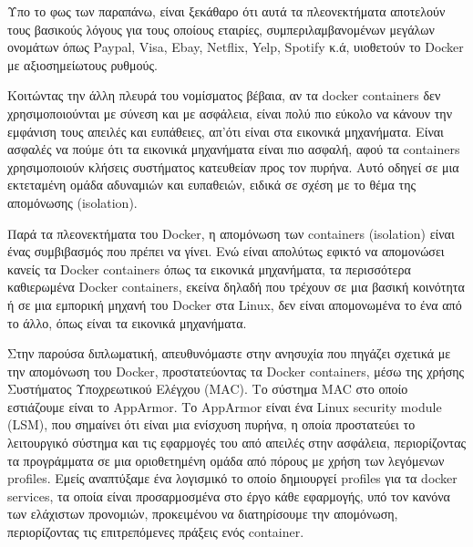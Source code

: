 Υπο το φως των παραπάνω, είναι ξεκάθαρο ότι αυτά τα πλεονεκτήματα αποτελούν τους βασικούς λόγους για τους οποίους εταιρίες, συμπεριλαμβανομένων μεγάλων ονομάτων όπως \en Paypal, Visa, Ebay, Netflix, Yelp, Spotify\gr{} κ.ά, υιοθετούν το \en Docker\gr{} με αξιοσημείωτους ρυθμούς.

Κοιτώντας την άλλη πλευρά του νομίσματος βέβαια, αν τα \en docker containers\gr{} δεν χρησιμοποιούνται με σύνεση και με ασφάλεια, είναι πολύ πιο εύκολο να κάνουν την εμφάνιση τους απειλές και ευπάθειες, απ'ότι είναι στα εικονικά μηχανήματα. Είναι ασφαλές να πούμε ότι τα εικονικά μηχανήματα είναι πιο ασφαλή, αφού τα \en containers\gr{} χρησιμοποιούν κλήσεις συστήματος κατευθείαν προς τον πυρήνα. Αυτό οδηγεί σε μια εκτεταμένη ομάδα αδυναμιών και ευπαθειών, ειδικά σε σχέση με το θέμα της απομόνωσης \en(isolation)\gr. 

Παρά τα πλεονεκτήματα του \en Docker\gr{}, η απομόνωση των \en containers (isolation)\gr{} είναι ένας συμβιβασμός που πρέπει να γίνει. Ενώ είναι απολύτως εφικτό να απομονώσει κανείς τα \en Docker containers\gr{} όπως τα εικονικά μηχανήματα, τα περισσότερα καθιερωμένα \en Docker containers\gr{}, εκείνα δηλαδή που τρέχουν σε μια βασική κοινότητα ή σε μια εμπορική μηχανή του \en Docker\gr{} στα \en Linux\gr{}, δεν είναι απομονωμένα το ένα από το άλλο, όπως είναι τα εικονικά μηχανήματα.

Στην παρούσα διπλωματική, απευθυνόμαστε στην ανησυχία που πηγάζει σχετικά με την απομόνωση του \en Docker\gr{}, προστατεύοντας τα \en Docker containers\gr{}, μέσω της χρήσης Συστήματος Υποχρεωτικού Ελέγχου \en (MAC)\gr. Το σύστημα \en MAC\gr{} στο οποίο εστιάζουμε είναι το \en AppArmor\gr{}. Το \en AppArmor\gr{} είναι ένα \en Linux security module (LSM)\gr{}, που σημαίνει ότι είναι μια ενίσχυση πυρήνα, η οποία προστατεύει το λειτουργικό σύστημα και τις εφαρμογές του από απειλές στην ασφάλεια, περιορίζοντας τα προγράμματα σε μια οριοθετημένη ομάδα από πόρους με χρήση των λεγόμενων \en profiles\gr{}. Εμείς αναπτύξαμε ένα λογισμικό το οποίο δημιουργεί \en profiles\gr{} για τα \en docker services\gr{}, τα οποία είναι προσαρμοσμένα στο έργο κάθε εφαρμογής, υπό τον κανόνα των ελάχιστων προνομιών, προκειμένου να διατηρίσουμε την απομόνωση, περιορίζοντας τις επιτρεπόμενες πράξεις ενός \en container.\gr{}

